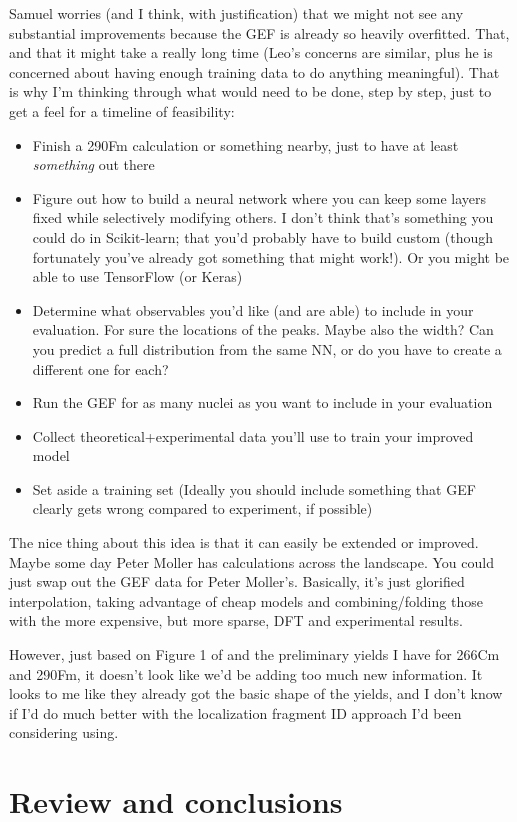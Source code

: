 Samuel worries (and I think, with justification) that we might not see any substantial improvements because the GEF is already so heavily overfitted. That, and that it might take a really long time (Leo's concerns are similar, plus he is concerned about having enough training data to do anything meaningful). That is why I'm thinking through what would need to be done, step by step, just to get a feel for a timeline of feasibility:

\begin{itemize}
	\item Finish a 290Fm calculation or something nearby, just to have at least \textit{something} out there
	\item Figure out how to build a neural network where you can keep some layers fixed while selectively modifying others. I don't think that's something you could do in Scikit-learn; that you'd probably have to build custom (though fortunately you've already got something that might work!). Or you might be able to use TensorFlow (or Keras)
	\item Determine what observables you'd like (and are able) to include in your evaluation. For sure the locations of the peaks. Maybe also the width? Can you predict a full distribution from the same NN, or do you have to create a different one for each?
	\item Run the GEF for as many nuclei as you want to include in your evaluation
	\item Collect theoretical+experimental data you'll use to train your improved model
	\item Set aside a training set (Ideally you should include something that GEF clearly gets wrong compared to experiment, if possible)
\end{itemize}

The nice thing about this idea is that it can easily be extended or improved. Maybe some day Peter Moller has calculations across the landscape. You could just swap out the GEF data for Peter Moller's. Basically, it's just glorified interpolation, taking advantage of cheap models and combining/folding those with the more expensive, but more sparse, DFT and experimental results.

However, just based on Figure 1 of \cite{Vassh2018} and the preliminary yields I have for 266Cm and 290Fm, it doesn't look like we'd be adding too much new information. It looks to me like they already got the basic shape of the yields, and I don't know if I'd do much better with the localization fragment ID approach I'd been considering using.

\section{Review and conclusions}
